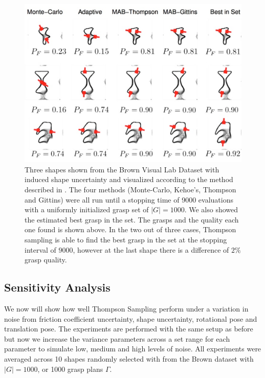 \documentclass[journal,transmag]{IEEEtran}%
\begin{document}
\begin{figure}%
\label{fig:shape_examples}
    \centering
    \includegraphics[width=16.5cm]{figures/shapes.png}%
  
    \caption{Three shapes shown from the Brown Visual Lab Dataset with induced shape uncertainty and visualized according to the method described in \cite{mahler2015gp}. The four methods (Monte-Carlo, Kehoe's, Thompson and Gittins) were all run until a stopping time of 9000 evaluations with a uniformly initialized grasp set of $|G|=1000$. We also showed the estimated best grasp in the set.  The grasps and the quality each one found is shown above.  In the two out of three cases, Thompson sampling is able to find the best grasp in the set at the stopping interval of $9000$, however at the last shape there is a difference of $2\%$ grasp quality.   }%
    \label{fig:shape_samples}%
\end{figure}



\subsection{Sensitivity Analysis }
We now will show how well  Thompson Sampling perform under a variation in noise from friction coefficient uncertainty, shape uncertainty, rotational pose and translation pose. The experiments are performed with the same setup as before but now we increase the variance parameters across a set range for each parameter to simulate low, medium and high levels of noise. All experiments were averaged across 10 shapes randomly selected with from the Brown dataset with $|G| = 1000$, or 1000 grasp plans $\Gamma$. 
\end{document}
